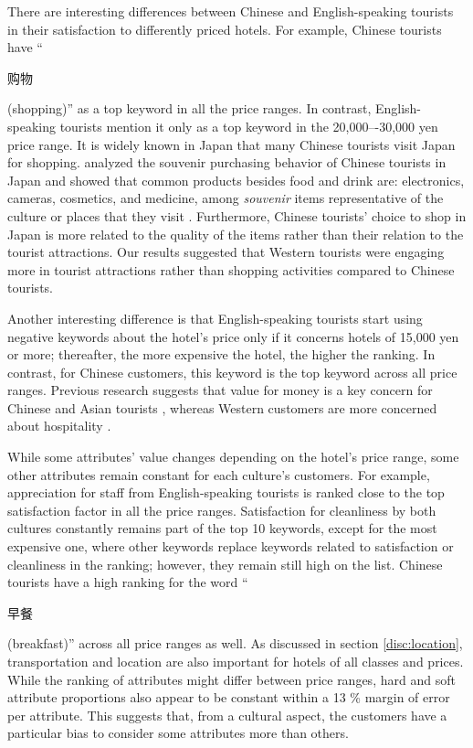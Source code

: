 \documentclass[smallextended,natbib]{svjour3}       %
\begin{document}
    There are interesting differences between Chinese and English-speaking tourists in their satisfaction to differently priced hotels. For example, Chinese tourists have ``\begin{CJK}{UTF8}{gbsn}购物\end{CJK} (shopping)'' as a top keyword in all the price ranges. In contrast, English-speaking tourists mention it only as a top keyword in the 20,000–-30,000 yen price range. It is widely known in Japan that many Chinese tourists visit Japan for shopping. \cite{tsujimoto2017purchasing} analyzed the souvenir purchasing behavior of Chinese tourists in Japan and showed that common products besides food and drink are: electronics, cameras, cosmetics, and medicine, among \textit{souvenir} items representative of the culture or places that they visit \cite{japan2014consumption}. Furthermore, Chinese tourists’ choice to shop in Japan is more related to the quality of the items rather than their relation to the tourist attractions. Our results suggested that Western tourists were engaging more in tourist attractions rather than shopping activities compared to Chinese tourists. 

    Another interesting difference is that English-speaking tourists start using negative keywords about the hotel's price only if it concerns hotels of 15,000 yen or more; thereafter, the more expensive the hotel, the higher the ranking. In contrast, for Chinese customers, this keyword is the top keyword across all price ranges. Previous research suggests that value for money is a key concern for Chinese and Asian tourists \cite[][]{choi2000,choi2001,truong2009}, whereas Western customers are more concerned about hospitality \cite[][]{kozak2002}.

    While some attributes' value changes depending on the hotel's price range, some other attributes remain constant for each culture's customers. For example, appreciation for staff from English-speaking tourists is ranked close to the top satisfaction factor in all the price ranges. Satisfaction for cleanliness by both cultures constantly remains part of the top 10 keywords, except for the most expensive one, where other keywords replace keywords related to satisfaction or cleanliness in the ranking; however, they remain still high on the list. Chinese tourists have a high ranking for the word ``\begin{CJK}{UTF8}{gbsn}早餐\end{CJK} (breakfast)'' across all price ranges as well. As discussed in section \ref{disc:location}, transportation and location are also important for hotels of all classes and prices. While the ranking of attributes might differ between price ranges, hard and soft attribute proportions also appear to be constant within a 13 \% margin of error per attribute. This suggests that, from a cultural aspect, the customers have a particular bias to consider some attributes more than others.
\end{document}
